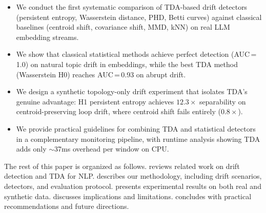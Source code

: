 \begin{itemize}[leftmargin=*,itemsep=0pt,topsep=0pt]
    \item We conduct the first systematic comparison of TDA-based drift detectors (persistent entropy, Wasserstein distance, PHD, Betti curves) against classical baselines (centroid shift, covariance shift, MMD, kNN) on real LLM embedding streams.
    \item We show that classical statistical methods achieve perfect detection (AUC\,=\,1.0) on natural topic drift in \agnews embeddings, while the best TDA method (Wasserstein H0) reaches AUC\,=\,0.93 on abrupt drift.
    \item We design a synthetic topology-only drift experiment that isolates TDA's genuine advantage: H1 persistent entropy achieves $12.3\times$ separability on centroid-preserving loop drift, where centroid shift fails entirely ($0.8\times$).
    \item We provide practical guidelines for combining TDA and statistical detectors in a complementary monitoring pipeline, with runtime analysis showing TDA adds only $\sim$37ms overhead per window on CPU.
\end{itemize}

The rest of this paper is organized as follows.  reviews related work on drift detection and TDA for NLP.  describes our methodology, including drift scenarios, detectors, and evaluation protocol.  presents experimental results on both real and synthetic data.  discusses implications and limitations.  concludes with practical recommendations and future directions.
